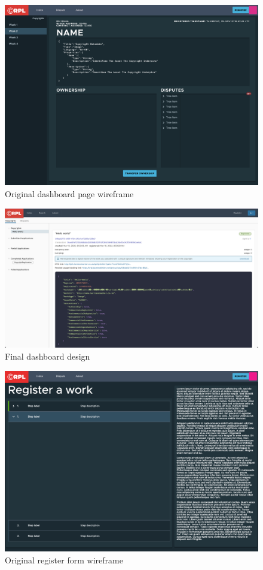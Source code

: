 \documentclass[12pt]{article}
\begin{document}
\begin{figure}[H]
\caption{Original dashboard page wireframe}
\centering
\includegraphics[width=\textwidth,height=0.5\textheight,keepaspectratio]{images/wireframe/Dashboard}
\end{figure}

\begin{figure}[H]
\caption{Final dashboard design}
\centering
\includegraphics[width=\textwidth,height=0.5\textheight,keepaspectratio]{images/wireframe/dashboard-real}
\end{figure}

\begin{figure}[H]
\caption{Original register form wireframe}
\centering
\includegraphics[width=\textwidth,height=0.5\textheight,keepaspectratio]{images/wireframe/Register}
\end{figure}
\end{document}
